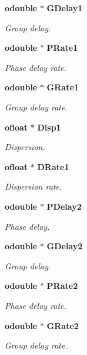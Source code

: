 \begin{CompactItemize}
{\bf odouble} $\ast$ {\bf GDelay1}
\begin{CompactList}\small\item\em Group delay. \item\end{CompactList}\item 
{\bf odouble} $\ast$ {\bf PRate1}
\begin{CompactList}\small\item\em Phase delay rate. \item\end{CompactList}\item 
{\bf odouble} $\ast$ {\bf GRate1}
\begin{CompactList}\small\item\em Group delay rate. \item\end{CompactList}\item 
{\bf ofloat} $\ast$ {\bf Disp1}
\begin{CompactList}\small\item\em Dispersion. \item\end{CompactList}\item 
{\bf ofloat} $\ast$ {\bf DRate1}
\begin{CompactList}\small\item\em Dispersion rate. \item\end{CompactList}\item 
{\bf odouble} $\ast$ {\bf PDelay2}
\begin{CompactList}\small\item\em Phase delay. \item\end{CompactList}\item 
{\bf odouble} $\ast$ {\bf GDelay2}
\begin{CompactList}\small\item\em Group delay. \item\end{CompactList}\item 
{\bf odouble} $\ast$ {\bf PRate2}
\begin{CompactList}\small\item\em Phase delay rate. \item\end{CompactList}\item 
{\bf odouble} $\ast$ {\bf GRate2}
\begin{CompactList}\small\item\em Group delay rate. \item\end{CompactList}\item 

\end{CompactItemize}
